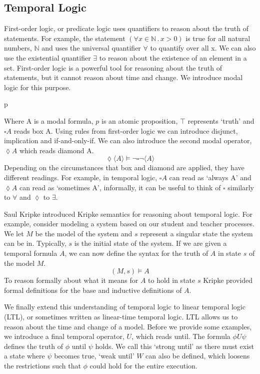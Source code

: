 \subsection{Temporal Logic}
First-order logic, or predicate logic uses quantifiers to reason about the truth of statements. For example, the statement $(\forall x \in \mathbb{N} \,.\, x > 0)$ is true for all natural numbers, $\mathbb{N}$ and uses the universal quantifier $\forall$ to quantify over all x. We can also use the existential quantifier $\exists$ to reason about the existence of an element in a set. First-order logic is a powerful tool for reasoning about the truth of statements, but it cannot reason about time and change. We introduce modal logic for this purpose.
\begin{bnf*}
      {p \bnfor \top \bnfor \neg {} \bnfor {} \land {} \bnfor \square {}}\\
\end{bnf*}
Where A is a modal formula, $p$ is an atomic proposition, $\top$ represents `truth' and $\square A$ reads box A. Using rules from first-order logic we can introduce disjunct, implication and if-and-only-if. We can also introduce the second modal operator, $\lozenge A$ which reads diamond A.
\[
\lozenge \langle A \rangle \models \neg \square \neg \langle A \rangle
\]
Depending on the circumstances that box and diamond are applied, they have different readings. For example, in temporal logic, $\square A$ can read as `always A' and $\lozenge A$ can read as `sometimes A', informally, it can be useful to think of $\square$ similarly to $\forall$ and $\lozenge$ to $\exists$.
\par
Saul Kripke introduced Kripke semantics \cite{kripke} for reasoning about temporal logic. For example, consider modeling a system based on our student and teacher processes. We let $M$ be the model of the system and $s$ represent a singular state the system can be in. Typically, $s$ is the initial state of the system. If we are given a temporal formula $A$, we can now define the syntax for the truth of $A$ in state $s$ of the model $M$.
\[
(M, s) \models A
\]
To reason formally about what it means for $A$ to hold in state $s$ Kripke provided formal definitions for the base and inductive definitions of $A$.
\par
We finally extend this understanding of temporal logic to linear temporal logic (LTL), or sometimes written as linear-time temporal logic. LTL allows us to reason about the time and change of a model. Before we provide some examples, we introduce a final temporal operator, $U$, which reads until. The formula $\phi U \psi$ defines the truth of $\phi$ until $\psi$ holds. We call this `strong until' as there must exist a state where $\psi$ becomes true, `weak until' $W$ can also be defined, which loosens the restrictions such that $\phi$ could hold for the entire execution.
